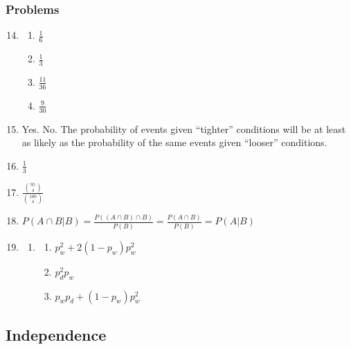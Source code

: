 \documentclass{article} \usepackage[margin=1in]{geometry}
\begin{document}
\subsubsection*{Problems}
\begin{enumerate}
	\setcounter{enumi}{13}
	\item \begin{enumerate}
		      \item $\frac{1}{6}$
		      \item $\frac{1}{3}$
		      \item $\frac{11}{36}$
		      \item $\frac{9}{30}$
	      \end{enumerate}
	\item Yes. No. The probability of events given ``tighter'' conditions will be at least as likely as the
	      probability of the same events given ``looser'' conditions.
	\item $\frac{1}{3}$
	\item $\frac{\binom{95}{4}}{\binom{100}{4}}$
	\item $P(A\cap B|B)=\frac{P((A\cap B)\cap B)}{P(B)}=\frac{P(A\cap B)}{P(B)}=P(A|B)$
	      \setcounter{enumi}{19}
	\item \begin{enumerate}
		      \item \begin{enumerate}
			            \item $p_w^2+2(1-p_w)p_w^2$
			            \item $p_d^2p_w$
			            \item $p_wp_d+(1-p_w)p_w^2$
		            \end{enumerate}
	      \end{enumerate}
\end{enumerate}

\subsection{Independence}
\end{document}
